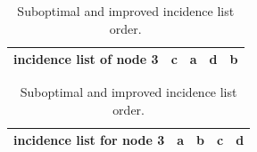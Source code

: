\begin{table}[htp]
          \centering
    \begin{tabular}{|l | c | c | c | c |}\hline
     incidence list of node 3 &  c & a & d & b\\ \hline
    \end{tabular}
    \vspace{0.5cm}
    
    \begin{tabular}{|l | c | c | c | c |}\hline
     incidence list for node 3 &  a & b & c & d\\ \hline
    \end{tabular}
      \caption{Suboptimal and improved incidence list order.}
    \label{inc-ord}
       \end{table}
